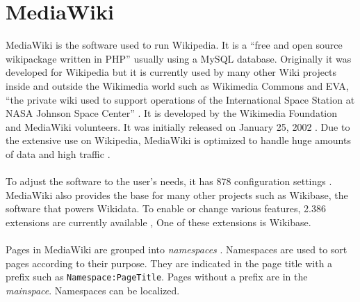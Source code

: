 \section{MediaWiki}

MediaWiki is the software used to run Wikipedia. It is a ``free and open source wikipackage written in PHP'' \citep{wiki:13} usually using a MySQL database. Originally it was developed for Wikipedia but it is currently used by many other Wiki projects inside and outside the Wikimedia world such as Wikimedia Commons and EVA, ``the private wiki used to support operations of the International Space Station at NASA Johnson Space Center'' \citep{eva-nasa}. It is developed by the Wikimedia Foundation and MediaWiki volunteers. It was initially released on January 25, 2002 \citep{wiki:13}. Due to the extensive use on Wikipedia, MediaWiki is optimized to handle huge amounts of data and high traffic \citep{wiki:14}. \\
\\
To adjust the software to the user's needs, it has 878 configuration settings \citep{wiki:15}. \\
MediaWiki also provides the base for many other projects such as Wikibase, the software that powers Wikidata. To enable or change various features, 2.386 extensions are currently available \citep{wiki:16}, One of these extensions is Wikibase. \\
\\
Pages in MediaWiki are grouped into \textit{namespaces} \citep{wiki:17}. Namespaces are used to sort pages according to their purpose. They are indicated in the page title with a prefix such as \texttt{\justify Namespace:PageTitle}. Pages without a prefix are in the \textit{mainspace}. Namespaces can be localized. 